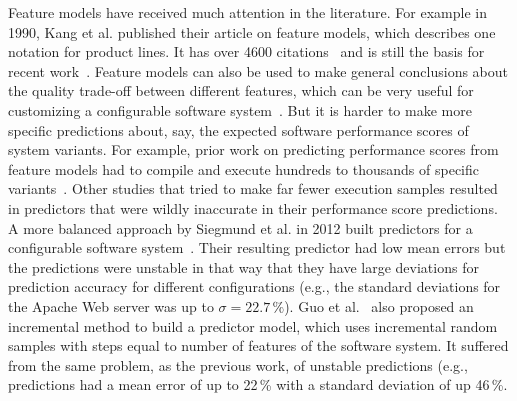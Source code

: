 \documentclass{sig-alternative}
\begin{document}
Feature models have received much attention in the literature.
For example in 1990, Kang et al. published their article on feature models, which describes one notation for product lines. It has over 4600 citations~\cite{kang1990feature} and is still the basis for 
recent work~\cite{lopez15,harman14,sayyad13a,sayyad13b}.
Feature models can also be used to make general conclusions about the quality trade-off between different features, which can be very useful for customizing a configurable software system~\cite{sayyad13a,sayyad13b}. 
But it is harder to make more specific 
predictions about, say, the expected software performance scores of system variants. 
For example, prior work on predicting performance scores from feature models had to compile and execute
hundreds to thousands of specific variants~\cite{guo2013variability}. 
Other studies that tried to make far fewer execution samples resulted
in predictors that were wildly inaccurate in their performance score predictions.
A more balanced approach by Siegmund et al. in 2012 built predictors for a configurable software system~\cite{siegmund2012predicting}. Their resulting predictor had low mean errors but the predictions
 were  unstable in that way that they have large deviations for prediction accuracy for different configurations (e.g., the standard deviations for the Apache Web server was up to $\sigma = 22.7\,\%$). 
Guo et al.~\cite{guo2013variability} also proposed an incremental method to build a predictor model, which uses incremental random samples with steps equal to number of features of the software system. It suffered from the same problem, as the previous work, of unstable predictions (e.g., predictions had a mean error of up to 22\,\% with a standard deviation of up 46\,\%.
\end{document}
